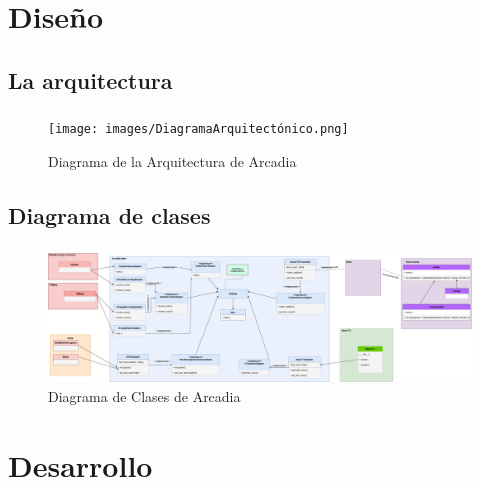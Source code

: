 \section{Diseño}
\subsection{La arquitectura}
\begin{frame}
	\frametitle{\insertsectionhead}
	\framesubtitle{\insertsubsectionhead}
  \begin{figure}
  	\texttt{[image: images/DiagramaArquitectónico.png]}
  	\caption{Diagrama de la Arquitectura de Arcadia}
  \end{figure}
\end{frame}

\subsection{Diagrama de clases}
\begin{frame}
	\frametitle{\insertsectionhead}
	\framesubtitle{\insertsubsectionhead}
	\begin{figure}
		\includegraphics[width=\textwidth]{images/DiagramaClases_General.png}
		\caption{Diagrama de Clases de Arcadia}
	\end{figure}
\end{frame}

\section{Desarrollo}

